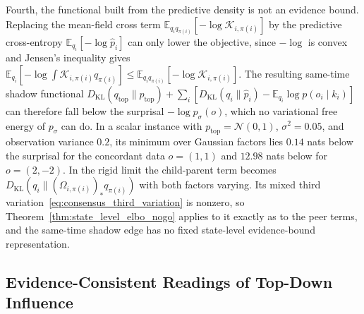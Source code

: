 \begin{remark}
Fourth, the functional built from the predictive density is not an evidence bound. Replacing the mean-field cross term $\mathbb{E}_{q_i q_{\pi(i)}}[-\log \mathcal{K}_{i,\pi(i)}]$ by the predictive cross-entropy $\mathbb{E}_{q_i}[-\log \hat{p}_i]$ can only lower the objective, since $-\log$ is convex and Jensen's inequality gives $\mathbb{E}_{q_i}[-\log \int \mathcal{K}_{i,\pi(i)} q_{\pi(i)}] \le \mathbb{E}_{q_i q_{\pi(i)}}[-\log \mathcal{K}_{i,\pi(i)}]$. The resulting same-time shadow functional $D_{\mathrm{KL}}(q_{\mathrm{top}}\|p_{\mathrm{top}}) + \sum_i [D_{\mathrm{KL}}(q_i\|\hat{p}_i) - \mathbb{E}_{q_i}\log p(o_i \mid k_i)]$ can therefore fall below the surprisal $-\log p_\sigma(o)$, which no variational free energy of $p_\sigma$ can do. In a scalar instance with $p_{\mathrm{top}} = \mathcal{N}(0,1)$, $\sigma^2 = 0.05$, and observation variance $0.2$, its minimum over Gaussian factors lies $0.14$ nats below the surprisal for the concordant data $o = (1,1)$ and $12.98$ nats below for $o = (2,-2)$. In the rigid limit the child-parent term becomes $D_{\mathrm{KL}}(q_i\|(\Omega_{i,\pi(i)})_* q_{\pi(i)})$ with both factors varying. Its mixed third variation~\eqref{eq:consensus_third_variation} is nonzero, so Theorem~\ref{thm:state_level_elbo_nogo} applies to it exactly as to the peer terms, and the same-time shadow edge has no fixed state-level evidence-bound representation.
\end{remark}

\subsection{Evidence-Consistent Readings of Top-Down Influence}

